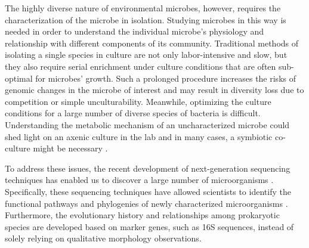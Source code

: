 
The highly diverse nature of environmental microbes, however, requires the characterization of the microbe in isolation. Studying microbes in this way is needed in order to understand the individual microbe's physiology and relationship with different components of its community. Traditional methods of isolating a single species in culture are not only labor-intensive and slow, but they also require serial enrichment under culture conditions that are often sub-optimal for microbes' growth\cite{Blainey:2013dp}. Such a prolonged procedure increases the risks of genomic changes in the microbe of interest and may result in diversity loss due to competition or simple unculturability. Meanwhile, optimizing the culture conditions for a large number of diverse species of bacteria is difficult. 
Understanding the metabolic mechanism of an uncharacterized microbe could shed light on an axenic culture in the lab and in many cases, a symbiotic co-culture might be necessary \cite{HuiWang:2014gj}. 

To address these issues, the recent development of next-generation sequencing techniques has enabled us to discover a large number of microorganisms \cite{Rinke:2014fu,Stepanauskas:2007ir}. Specifically, these sequencing techniques have allowed scientists to identify the functional pathways and phylogenies of newly characterized microorganisms \cite{Rinke:2013bt}. Furthermore, the evolutionary history and relationships among prokaryotic species are developed based on marker genes, such as 16S sequences, instead of solely relying on qualitative morphology observations. 

